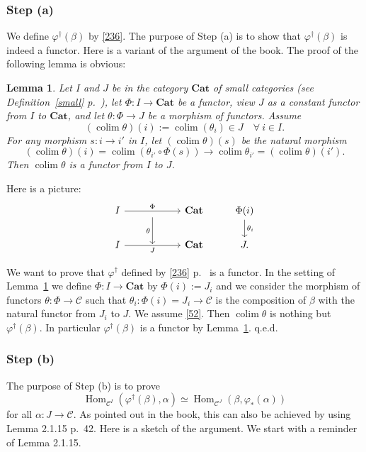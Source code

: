\documentclass[12pt]{article}
\newtheorem{lem}[thm]{Lemma}
\theoremstyle{remark}
\theoremstyle{definition}
\newcommand{\C}{\mathcal C}
\newcommand{\Cat}{\mathbf{Cat}}%
\newcommand{\pp}{\varphi}
\DeclareMathOperator*{\co}{colim}
\DeclareMathOperator{\Hom}{Hom}%
\begin{document}
\subsubsection{Step (a)}\label{scji}
%
We define $\varphi^\dagger(\beta)$ by \eqref{236}. The purpose of Step (a) is to show that $\varphi^\dagger(\beta)$ is indeed a functor. Here is a variant of the argument of the book. The proof of the following lemma is obvious: 
%
\begin{lem}\label{r52}
%
Let $I$ and $J$ be in the category $\Cat$ of small categories (see Definition~\ref{small} p.~\pageref{small}), let $\Phi:I\to\Cat$ be a functor, view $J$ as a constant functor from $I$ to $\Cat$, and let $\theta:\Phi\to J$ be a morphism of functors. Assume 
%
\begin{equation}\label{52} 
(\co\theta)(i):=\co(\theta_i)\in J\quad\forall\ i\in I. 
\end{equation} 
%
For any morphism $s:i\to i'$ in $I$, let $(\co\theta)(s)$ be the natural morphism 
$$
(\co\theta)(i)=\co(\theta_{i'}\circ\Phi(s))\to
\co\theta_{i'}=(\co\theta)(i'). 
$$ 
Then $\co\theta$ is a functor from $I$ to $J$. 
%
\end{lem}
%
Here is a picture:
$$
\begin{tikzcd}
I\ar{rr}{\Phi}&\ar{d}[swap]{\theta}&\Cat&\Phi(i)\ar{d}{\theta_i}\\ 
I\ar{rr}[swap]{J}&{}&\Cat&J.
\end{tikzcd}
$$

We want to prove that $\pp^\dagger$ defined by \eqref{236} p.~\pageref{236} is a functor. In the setting of Lemma~\ref{r52} we define $\Phi:I\to\Cat$ by $\Phi(i):=J_i$ and we consider the morphism of functors $\theta:\Phi\to\C$ such that $\theta_i:\Phi(i)=J_i\to\C$ is the composition of $\beta$ with the natural functor from $J_i$ to $J$. We assume \eqref{52}. Then $\co\theta$ is nothing but $\varphi^\dagger(\beta)$. In particular $\varphi^\dagger(\beta)$ is a functor by Lemma~\ref{r52}. q.e.d.
%
\subsubsection{Step (b)}
%
The purpose of Step (b) is to prove 
%
\begin{equation}\label{stepb}
\Hom_{\C^I}(\varphi^\dagger(\beta),\alpha)\simeq\Hom_{\C^J}(\beta,\varphi_*(\alpha)) 
\end{equation} 
% 
for all $\alpha:J\to\C$. As pointed out in the book, this can also be achieved by using Lemma 2.1.15 p.~42. Here is a sketch of the argument. We start with a reminder of Lemma 2.1.15. 
\end{document}
